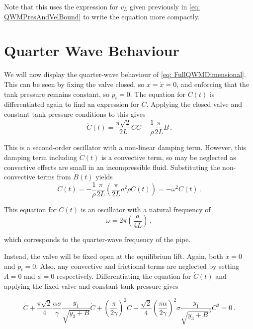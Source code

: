 Note that this uses the expression for $v_L$ given previously in \cref{eq: QWMPresAndVelBound} to write the equation more compactly.

\section{Quarter Wave Behaviour} \label{sec: QWBehaviour}

We will now display the quarter-wave behaviour of \cref{eq: FullQWMDimensional}. This can be seen by fixing the valve closed, so $x = \dot{x} = 0$, and enforcing that the tank pressure remains constant, so $\dot{p}_t = 0$. The  equation for $\dot{C}(t)$ is differentiated again to find an expression for $\ddot{C}$. Applying the closed valve and constant tank pressure conditions to this gives
~
\begin{equation*}
    \ddot{C}(t) = \frac{\pi \sqrt{2}}{2 L} C \dot{C} - \frac{1}{\rho} \frac{\pi}{2 L} \dot{B} \, .
\end{equation*}

This is a second-order oscillator with a non-linear damping term. However, this damping term including $\dot{C}(t)$ is a convective term, so may be neglected as convective effects are small in an incompressible fluid. Substituting the non-convective terms from $\dot{B}(t)$ yields
~
\begin{equation*}
    \ddot{C}(t) = - \frac{1}{\rho} \frac{\pi}{2 L} \left( \frac{\pi}{2L} a^2 \rho C(t) \right) = - \omega^2 C(t) \, .
\end{equation*}

This equation for $\ddot{C}(t)$ is an oscillator with a natural frequency of
~
\begin{equation*}
    \omega = 2 \pi \left( \frac{a}{4 L} \right) \, ,
\end{equation*}

which corresponds to the quarter-wave frequency of the pipe.

Instead, the valve will be fixed open at the equilibrium lift. Again, both $\dot{x} = 0$ and $\dot{p}_t = 0$. Also, any convective and frictional terms are neglected by setting $\Lambda = 0$ and $\phi = 0$ respectively. Differentiating the equation for $\dot{C}(t)$ and applying the fixed valve and constant tank pressure gives

\begin{equation*}
    \ddot{C} + \frac{\pi \sqrt{2}}{4} \frac{\alpha \sigma}{\gamma} \frac{y_1}{\sqrt{y_3 + B}} \dot{C} + \left( \frac{\pi}{2 \gamma} \right)^2 C - \frac{\sqrt{2}}{4} \left( \frac{\pi \alpha}{2 \gamma} \right)^2 \sigma \frac{y_1}{\sqrt{y_3 + B}^3} C^2 = 0 \, .
\end{equation*}


